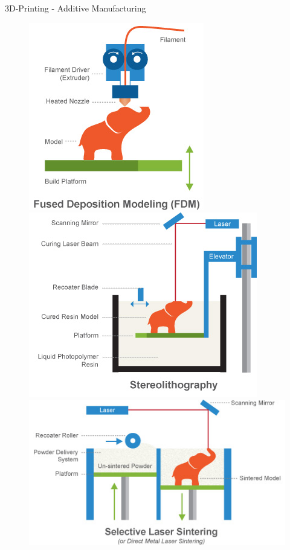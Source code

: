 \documentclass{beamer}
\begin{document}
\begin{frame}{3D-Printing - Additive Manufacturing }
\begin{figure}
\includegraphics[width=0.25\linewidth]{images/fdm.jpg}
\includegraphics[width=0.3\linewidth]{images/stereolithography.jpg}
\includegraphics[width=0.37\linewidth]{images/selective-laser-sintering.jpg}\\
	\hspace*{11pt}\hbox{\scriptsize {}}
\end{figure}
\end{frame}
\end{document}
